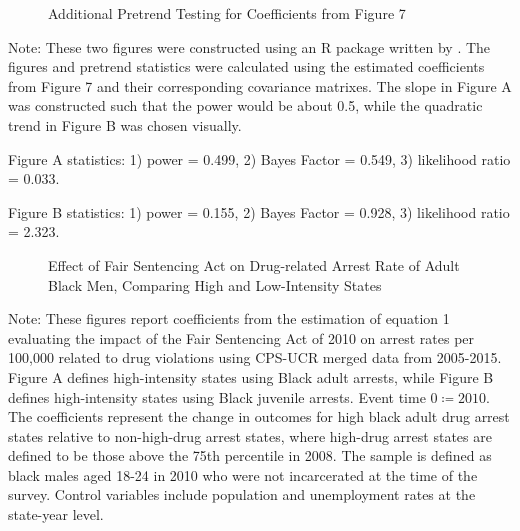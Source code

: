   \clearpage

  \begin{figure}[h]
    \centering
    \caption{Additional Pretrend Testing for Coefficients from Figure 7}%
    \qquad
    \label{fig:pretrends_roth}%
  \end{figure}

  \begin{footnotesize}
    \noindent Note: These two figures were constructed using an R package written by \cite{roth2022}. The figures and pretrend statistics were calculated using the estimated coefficients from Figure 7 and their corresponding covariance matrixes. The slope in Figure A was constructed such that the power would be about 0.5, while the quadratic trend in Figure B was chosen visually.

    Figure A statistics: 1) power = 0.499, 2) Bayes Factor = 0.549, 3) likelihood ratio = 0.033.

    Figure B statistics: 1) power = 0.155, 2) Bayes Factor = 0.928, 3) likelihood ratio = 2.323.
  \end{footnotesize}

  \clearpage
  
  \begin{figure}[h]
    \centering
    \caption{Effect of Fair Sentencing Act on Drug-related Arrest Rate of Adult Black Men, Comparing High and Low-Intensity States}%
    \qquad
    \label{fig:fs_es_2010}%
  \end{figure}


  \begin{footnotesize}
    \noindent Note: These figures report coefficients from the estimation of equation 1 evaluating the impact of the Fair Sentencing Act of 2010 on arrest rates per 100,000 related to drug violations using CPS-UCR merged data from 2005-2015. Figure A defines high-intensity states using Black adult arrests, while Figure B defines high-intensity states using Black juvenile arrests. Event time $0 \coloneqq 2010$. The coefficients represent the change in outcomes for high black adult drug arrest states relative to non-high-drug arrest states, where high-drug arrest states are defined to be those above the 75th percentile in 2008. The sample is defined as black males aged 18-24 in 2010 who were not incarcerated at the time of the survey. Control variables include population and unemployment rates at the state-year level. 
  \end{footnotesize}

